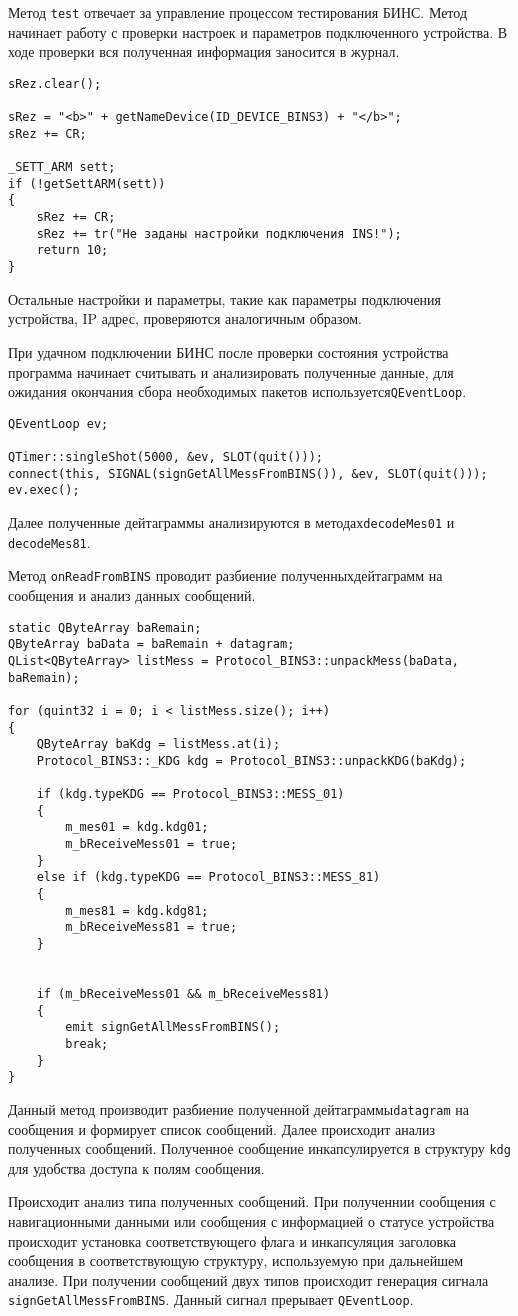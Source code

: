 Метод \texttt{test} отвечает за управление процессом тестирования БИНС. Метод начинает работу с проверки настроек и
параметров подключенного устройства. В ходе проверки вся полученная информация заносится в журнал.
\medskip
\begin{verbatim}
sRez.clear();

sRez = "<b>" + getNameDevice(ID_DEVICE_BINS3) + "</b>";
sRez += CR;

_SETT_ARM sett;
if (!getSettARM(sett))
{
	sRez += CR;
	sRez += tr("Не заданы настройки подключения INS!");
	return 10;
}
\end{verbatim}
\medskip

Остальные настройки и параметры, такие как параметры подключения устройства, IP адрес, проверяются аналогичным образом.

При удачном подключении БИНС после проверки состояния устройства программа начинает считывать и анализировать полученные
данные, для ожидания окончания сбора необходимых пакетов используется\break \texttt{QEventLoop}.
\medskip
\begin{verbatim}
QEventLoop ev;

QTimer::singleShot(5000, &ev, SLOT(quit()));
connect(this, SIGNAL(signGetAllMessFromBINS()), &ev, SLOT(quit()));
ev.exec();
\end{verbatim}
\medskip

Далее полученные дейтаграммы анализируются в методах\break \texttt{decodeMes01} и \texttt{decodeMes81}.

Метод \texttt{onReadFromBINS} проводит разбиение полученных\break дейтаграмм на сообщения и анализ данных сообщений.
\medskip
\begin{verbatim}
static QByteArray baRemain;
QByteArray baData = baRemain + datagram;
QList<QByteArray> listMess = Protocol_BINS3::unpackMess(baData, baRemain);

for (quint32 i = 0; i < listMess.size(); i++)
{
	QByteArray baKdg = listMess.at(i);
	Protocol_BINS3::_KDG kdg = Protocol_BINS3::unpackKDG(baKdg);

	if (kdg.typeKDG == Protocol_BINS3::MESS_01)
	{
		m_mes01 = kdg.kdg01;
		m_bReceiveMess01 = true;
	}
	else if (kdg.typeKDG == Protocol_BINS3::MESS_81)
	{
		m_mes81 = kdg.kdg81;
		m_bReceiveMess81 = true;
	}


	if (m_bReceiveMess01 && m_bReceiveMess81)
	{
		emit signGetAllMessFromBINS();
		break;
	}
}
\end{verbatim}
\medskip

Данный метод производит разбиение полученной дейтаграммы\break \texttt{datagram} на сообщения и формирует список сообщений.
Далее происходит анализ полученных сообщений. Полученное сообщение инкапсулируется в структуру \texttt{kdg} для удобства
доступа к полям сообщения.

Происходит анализ типа полученных сообщений. При полученнии сообщения с навигационными данными или сообщения с
информацией о статусе устройства происходит установка соответствующего флага и инкапсуляция заголовка сообщения в
соответствующую структуру, используемую при дальнейшем анализе. При получении сообщений двух типов происходит генерация
сигнала \texttt{signGetAllMessFromBINS}. Данный сигнал прерывает \texttt{QEventLoop}.


